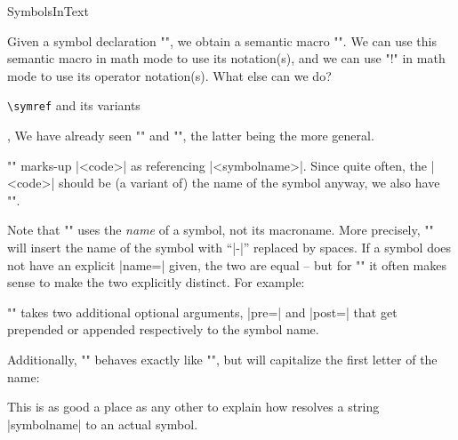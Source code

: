 \begin{smodule}{SymbolsInText}

    Given a symbol declaration \stexcode"",
    we obtain a semantic macro \stexcode"\symbolname".
    We can use this semantic macro in math mode to use its notation(s),
    and we can use \stexcode"\symbolname!" 
    in math mode to use its operator notation(s).
    What else can we do?
    
\begin{sfragment}{\texttt{\textbackslash symref} and its variants}

    \begin{function}{\symref,\symname}
        We have already seen \stexcode"\symname" and
        \stexcode"\symref", the latter being the more general.

        \stexcode"" marks-up |<code>|
        as referencing |<symbolname>|. Since quite often, the |<code>|
        should be (a variant of) the name of the symbol anyway,
        we also have \stexcode"".
    \end{function}

    Note that \stexcode"\symname" uses the \emph{name}
    of a symbol, not its macroname. More precisely, 
    \stexcode"\symname" will insert the name of the symbol
    with ``|-|'' replaced by spaces.
    If a symbol does not have
    an explicit |name=| given, the two are equal -- but
    for \stexcode"\symname" it often makes sense to make the
    two explicitly distinct. For example:

    \stexcode"\symname" takes two additional optional
    arguments, |pre=| and |post=| that get prepended or appended
    respectively to the symbol name.

    \begin{function}{\Symname}
        Additionally, \stexcode"\Symname" behaves exactly
        like \stexcode"\symname", but will capitalize the first
        letter of the name:
    \end{function}

    \begin{dangerbox}
        This is as good a place as any other to explain how
        \sTeX resolves a string |symbolname| to an actual symbol.


\end{dangerbox}
\end{sfragment}
\end{smodule}
